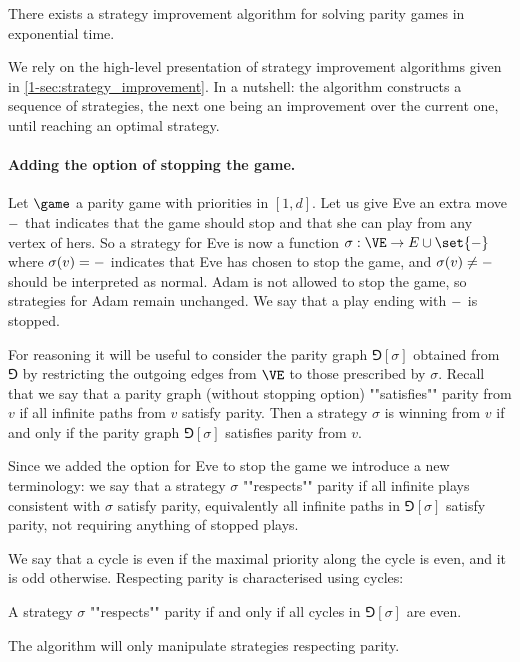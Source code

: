 \begin{theorem}
\label{3-thm:strategy_improvement}
There exists a strategy improvement algorithm for solving parity games in exponential time.
\end{theorem}

We rely on the high-level presentation of strategy improvement algorithms given in \cref{1-sec:strategy_improvement}.
In a nutshell: the algorithm constructs a sequence of strategies, the next one being an improvement over the current one,
until reaching an optimal strategy.

\paragraph{\bf Adding the option of stopping the game.}
Let $\game$ a parity game with priorities in $[1,d]$.
Let us give Eve an extra move $\mathtt{-}$ that indicates that the game should stop and that she can play from any vertex of hers.
So a strategy for Eve is now a function $\sigma : \VE \rightarrow E \cup \set{\siblank}$ 
where $\sigma(v) = \mathtt{-}$ indicates that Eve has chosen to stop the game, and $\sigma(v) \ne \mathtt{-}$ should be interpreted as normal.
Adam is not allowed to stop the game, so strategies for Adam remain unchanged.
We say that a play ending with $\mathtt{-}$ is stopped.

For reasoning it will be useful to consider the parity graph $\Game[\sigma]$ obtained from $\Game$ by restricting the outgoing edges from $\VE$
to those prescribed by $\sigma$. 
Recall that we say that a parity graph (without stopping option) ""satisfies"" parity from $v$ if all infinite paths from $v$ satisfy parity.
Then a strategy $\sigma$ is winning from $v$ if and only if the parity graph $\Game[\sigma]$ satisfies parity from $v$.

Since we added the option for Eve to stop the game we introduce a new terminology: 
we say that a strategy $\sigma$ ""respects"" parity if all infinite plays consistent with $\sigma$ satisfy parity,
equivalently all infinite paths in $\Game[\sigma]$ satisfy parity, not requiring anything of stopped plays.

We say that a cycle is even if the maximal priority along the cycle is even, and it is odd otherwise. 
Respecting parity is characterised using cycles:
\begin{fact}
A strategy $\sigma$ ""respects"" parity if and only if all cycles in $\Game[\sigma]$ are even.
\end{fact}
The algorithm will only manipulate strategies respecting parity.

